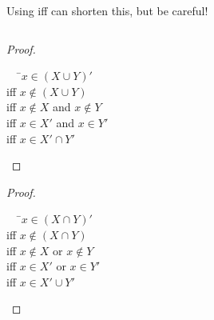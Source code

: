 \documentclass[\main/notes.tex]{subfiles}
\begin{document}
			Using iff can shorten this, but be careful!
			\begin{example}
				$ $\\
				\begin{minipage}{0.4\textwidth}
					\begin{proof}
						$ $
						\begin{tabbing}
							$\quad$ \=$x \in (X \cup Y)'$\\
							iff \>$x \notin (X \cup Y)$\\
							iff \>$x \notin X$ and $x \notin Y$\\
							iff \>$x \in X'$ and $x \in Y'$\\
							iff \>$x \in X' \cap Y'$
						\end{tabbing}
					\end{proof}
				\end{minipage}
				\hfill
				\begin{minipage}{0.4\textwidth}
					\begin{proof}
						$ $ 
						\begin{tabbing}
							$\quad$ \=$x \in (X \cap Y)'$\\
							iff \> $x \notin (X \cap Y)$\\
							iff \> $x \notin X$ or $x \notin Y$\\
							iff \> $x \in X'$ or $x \in Y'$\\
							iff \> $x \in X' \cup Y'$
						\end{tabbing}
					\end{proof}
				\end{minipage}
			\end{example}
			\pagebreak
\end{document}
